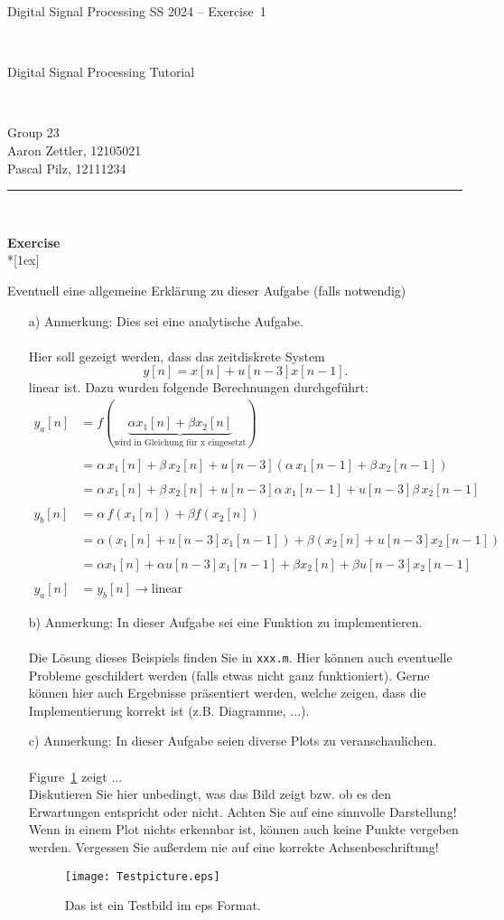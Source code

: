 \documentclass[12pt,a4paper,austrian]{article}
\newcounter{theaufgabe}\setcounter{theaufgabe}{1}
\newenvironment{aufgabe}[1]%
  {\bigskip\par\noindent\begin{nopagebreak}
    \textsf{\textbf{Exercise \arabic{theaufgabe}}}\quad
      \textsf{\textit{#1}}\\*[1ex]%
\stepcounter{theaufgabe}\hspace{2ex}\end{nopagebreak}}
  {\par\pagebreak[2]}
\newcommand{\printpreamble}{
  \pagestyle{plain}
  \thispagestyle{empty}
  \noindent
  \begin{minipage}[b][4cm]{1.0\textwidth}  
  \begin{center}
  \begin{bf} 
  \begin{large} Digital Signal Processing SS 2024 -- Exercise~1\end{large} \\
  \vspace{0.3cm}
  \begin{Large} Digital Signal Processing Tutorial  \end{Large} \\
  \vspace{0.3cm}
  \end{bf}
  \begin{large} 
  Group 23\\
  Aaron Zettler, 12105021\\
  Pascal Pilz, 12111234\\
  \end{large} 
  \end{center}
  \end{minipage}
  
  \noindent \rule[0.8em]{\textwidth}{0.12mm}\\[-0.5em]
}
\begin{document}
\printpreamble



\begin{aufgabe}{}
Eventuell eine allgemeine Erklärung zu dieser Aufgabe (falls notwendig)
\begin{enumerate}
\item [a)] 
Anmerkung: Dies sei eine analytische Aufgabe. \\ \\
Hier soll gezeigt werden, dass das zeitdiskrete System 
\[
y[n] = x[n] + u[n-3] x[n-1].
\]
linear ist. Dazu wurden folgende Berechnungen durchgeführt:\\
%
\begin{align*}
y_a[n] &= f\left(\underbrace{\alpha x_1[n] + \beta x_2[n]}_{\text{wird in Gleichung für x eingesetzt}}\right)\\ \\
       &= \alpha\,x_1[n] + \beta\,x_2[n] + u[n-3] (\alpha\,x_1[n-1] + \beta\,x_2[n-1])\\ \\
       &= \alpha\,x_1[n] + \beta\,x_2[n] + u[n-3] \alpha\,x_1[n-1] + u[n-3]  \beta\,x_2[n-1] \\ \\ 
y_b[n] &= \alpha\,f(x_1[n]) + \beta f(x_2[n])\\ \\
       &= \alpha (x_1[n] + u[n-3] x_1[n-1]) + \beta (x_2[n] + u[n-3] x_2[n-1])     \\ \\
       &= \alpha x_1[n] + \alpha u[n-3] x_1[n-1] + \beta x_2[n] + \beta u[n-3] x_2[n-1] \\ \\
       y_a[n] &= y_b[n] \rightarrow \text{linear} 
\end{align*}
%
\item [b)]
Anmerkung: In dieser Aufgabe sei eine Funktion zu implementieren. \\ \\
Die Lösung dieses Beispiels finden Sie in \texttt{xxx.m}. Hier können auch eventuelle Probleme geschildert werden (falls etwas nicht ganz funktioniert). Gerne können hier auch Ergebnisse präsentiert werden, welche zeigen, dass die Implementierung korrekt ist (z.B. Diagramme, ...).

\item [c)] 
Anmerkung: In dieser Aufgabe seien diverse Plots zu veranschaulichen. \\ \\
Figure~\ref{fig:Testpicture} zeigt ... \\
Diskutieren Sie hier unbedingt, was das Bild zeigt bzw. ob es den Erwartungen entspricht oder nicht. Achten Sie auf eine sinnvolle Darstellung! Wenn in einem Plot nichts erkennbar ist, können auch keine Punkte vergeben werden. Vergessen Sie außerdem nie auf eine korrekte Achsenbeschriftung! 
\begin{figure}[!ht]
	\centering
	\texttt{[image: Testpicture.eps]}
	\vspace{-0.3cm}
	\caption{Das ist ein Testbild im eps Format.}
	\label{fig:Testpicture}
	\vspace{-0.1cm}
\end{figure}


\end{enumerate}
\end{aufgabe}
\end{document}
